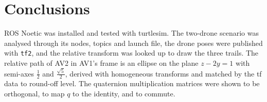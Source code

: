 \documentclass[a4paper]{tufte-handout}
\begin{document}
\section{Conclusions}
ROS Noetic was installed and tested with turtlesim.
The two-drone scenario was analysed through its nodes, topics and launch
file, the drone poses were published with \texttt{tf2}, and the relative
transform was looked up to draw the three trails.
The relative path of AV2 in AV1's frame is an ellipse on the plane
$z - 2y = 1$ with semi-axes $\tfrac12$ and $\tfrac{\sqrt5}{2}$, derived with
homogeneous transforms and matched by the tf data to round-off level.
The quaternion multiplication matrices were shown to be orthogonal, to map
$q$ to the identity, and to commute.



\end{document}
